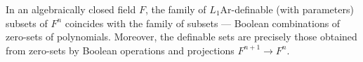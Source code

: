 In an algebraically closed field $F$, the family of $L_1\mathrm{Ar}$-definable (with parameters) subsets of $F^n$ coincides with the family of  subsets — Boolean combinations of zero-sets of polynomials. Moreover, the definable sets are precisely those obtained from zero-sets by Boolean operations and projections $F^{n+1} \to F^n$.
